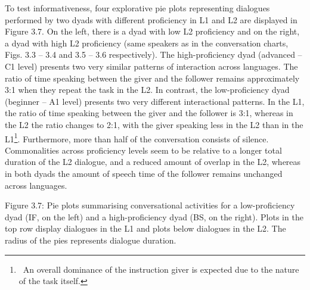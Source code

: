 \begin{styleStandard}
To test informativeness, four explorative pie plots representing dialogues performed by two dyads with different proficiency in L1 and L2 are displayed in Figure 3.7. On the left, there is a dyad with low L2 proficiency and on the right, a dyad with high L2 proficiency (same speakers as in the conversation charts, Figs. 3.3 – 3.4 and 3.5 – 3.6 respectively). The high-proficiency dyad (advanced – C1 level) presents two very similar patterns of interaction across languages. The ratio of time speaking between the giver and the follower remains approximately 3:1 when they repeat the task in the L2. In contrast, the low-proficiency dyad (beginner – A1 level) presents two very different interactional patterns. In the L1, the ratio of time speaking between the giver and the follower is 3:1, whereas in the L2 the ratio changes to 2:1, with the giver speaking less in the L2 than in the L1\footnote{\ An overall dominance of the instruction giver is expected due to the nature of the task itself.}. Furthermore, more than half of the conversation consists of silence. Commonalities across proficiency levels seem to be relative to a longer total duration of the L2 dialogue, and a reduced amount of overlap in the L2, whereas in both dyads the amount of speech time of the follower remains unchanged across languages.
\end{styleStandard}

\begin{styleStandard}
  [Warning: Image ignored] %
 
\end{styleStandard}

\begin{stylecaption}
Figure 3.7: Pie plots summarising conversational activities for a low-proficiency dyad (IF, on the left) and a high-proficiency dyad (BS, on the right). Plots in the top row display dialogues in the L1 and plots below dialogues in the L2. The radius of the pies represents dialogue duration.
\end{stylecaption}

